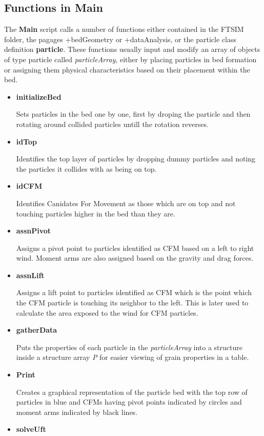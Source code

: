 \documentclass{article}
\begin{document}
\subsection*{Functions in Main}
	The \textbf{Main} script calls a number of functions either contained in the FTSIM folder, the pagages +bedGeometry or +dataAnalysis, or the particle class definition \textbf{particle}. These functions usually input and modify an array of objects of type particle called \textit{particleArray}, either by placing particles in bed formation or assigning them physical characteristics based on their placement within the bed.
\begin{itemize}
	\item \textbf{initializeBed}
	
	Sets particles in the bed one by one, first by droping the particle and then rotating around collided particles untill the rotation reverses.
	\item \textbf{idTop}
	
	Identifies the top layer of particles by dropping dummy particles and noting the particles it collides with as being on top.
	\item \textbf{idCFM}
	
	Identifies Canidates For Movement as those which are on top and not touching particles higher in the bed than they are.
	\item \textbf{assnPivot}
	
	Assigns a pivot point to particles identified as CFM based on a left to right wind. Moment arms are also assigned based on the gravity and drag forces.
	\item \textbf{assnLift}
	
	Assigns a lift point to particles identified as CFM which is the point which the CFM particle is touching its neighbor to the left. This is later used to calculate the area exposed to the wind for CFM particles.
	\item \textbf{gatherData}
	
	Puts the properties of each particle in the \textit{particleArray} into a structure inside a structure array \textit{P} for easier viewing of grain properties in a table.
	\item \textbf{Print}
	
	Creates a graphical representation of the particle bed with the top row of particles in blue and CFMs having pivot points indicated by circles and moment arms indicated by black lines.
	
	\item \textbf{solveUft}
	

\end{itemize}
\end{document}
